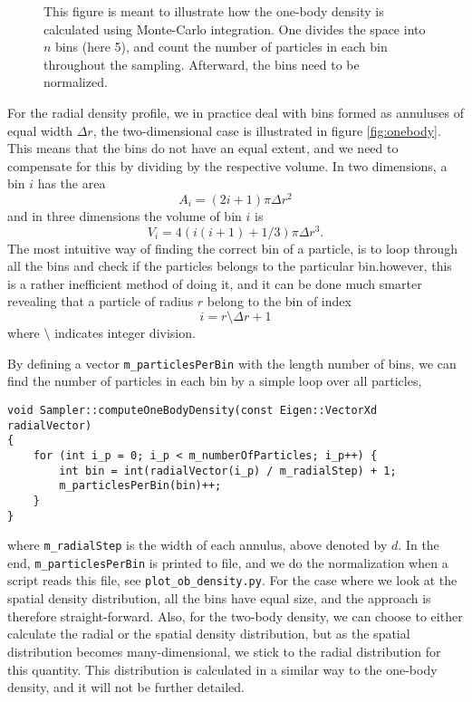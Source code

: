 \begin{figure}
	\centering
	
	\caption{This figure is meant to illustrate how the one-body density is calculated using Monte-Carlo integration. One divides the space into $n$ bins (here 5), and count the number of particles in each bin throughout the sampling. Afterward, the bins need to be normalized.}
	\label{fig:onebody}
\end{figure}
For the radial density profile, we in practice deal with bins formed as annuluses of equal width $\Delta r$, the two-dimensional case is illustrated in figure \eqref{fig:onebody}. This means that the bins do not have an equal extent, and we need to compensate for this by dividing by the respective volume. In two dimensions, a bin $i$ has the area
\begin{equation}
A_i=(2i+1)\pi \Delta r^2
\end{equation}
and in three dimensions the volume of bin $i$ is
\begin{equation}
V_i=4(i(i+1)+1/3)\pi \Delta r^3.
\end{equation}
The most intuitive way of finding the correct bin of a particle, is to loop through all the bins and check if the particles belongs to the particular bin.however, this is a rather inefficient method of doing it, and it can be done much smarter revealing that a particle of radius $r$ belong to the bin of index
\begin{equation}
i=r\setminus \Delta r + 1
\end{equation}
where $\setminus$ indicates integer division. 

By defining a vector \lstinline|m_particlesPerBin| with the length number of bins, we can find the number of particles in each bin by a simple loop over all particles,
\begin{lstlisting}
void Sampler::computeOneBodyDensity(const Eigen::VectorXd radialVector)
{
	for (int i_p = 0; i_p < m_numberOfParticles; i_p++) {
		int bin = int(radialVector(i_p) / m_radialStep) + 1;
		m_particlesPerBin(bin)++;
	}
}
\end{lstlisting}
where \lstinline|m_radialStep| is the width of each annulus, above denoted by $d$. In the end, \lstinline|m_particlesPerBin| is printed to file, and we do the normalization when a script reads this file, see \lstinline|plot_ob_density.py|. For the case where we look at the spatial density distribution, all the bins have equal size, and the approach is therefore straight-forward. Also, for the two-body density, we can choose to either calculate the radial or the spatial density distribution, but as the spatial distribution becomes many-dimensional, we stick to the radial distribution for this quantity. This distribution is calculated in a similar way to the one-body density, and it will not be further detailed. 

